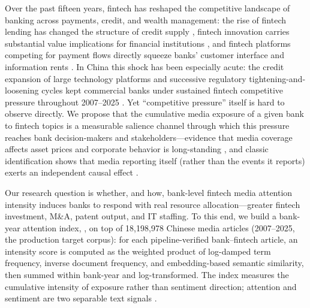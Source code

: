 Over the past fifteen years, fintech has reshaped the competitive landscape of
banking across payments, credit, and wealth management: the rise of fintech
lending has changed the structure of credit supply \parencite{berg2022fintechlending},
fintech innovation carries substantial value implications for financial
institutions \parencite{chen2019fintechvalue}, and fintech platforms competing
for payment flows directly squeeze banks' customer interface and information
rents \parencite{parlour2022payment}. In China this shock has been especially
acute: the credit expansion of large technology platforms and successive
regulatory tightening-and-loosening cycles kept commercial banks under
sustained fintech competitive pressure throughout 2007--2025
\parencite{hau2024fintechcredit}. Yet ``competitive pressure'' itself is hard
to observe directly. We propose that the cumulative media exposure of a given
bank to fintech topics is a measurable salience channel through which this
pressure reaches bank decision-makers and stakeholders---evidence that media
coverage affects asset prices and corporate behavior is long-standing
\parencite{fang2009media,da2011attention}, and classic identification shows
that media reporting itself (rather than the events it reports) exerts an
independent causal effect \parencite{engelberg2011causal,peress2014strikes}.

Our research question is whether, and how, bank-level fintech media attention
intensity induces banks to respond with real resource allocation---greater
fintech investment, M\&A, patent output, and IT staffing. To this end, we
build a bank-year attention index, , on top of
18{,}198{,}978 Chinese media articles (2007--2025, the production target
corpus): for each pipeline-verified bank--fintech article, an intensity score
is computed as the weighted product of log-damped term frequency, inverse
document frequency, and embedding-based semantic similarity, then summed
within bank-year and log-transformed. The index measures the cumulative
intensity of exposure rather than sentiment direction; attention and sentiment
are two separable text signals \parencite{cookson2024social}.

